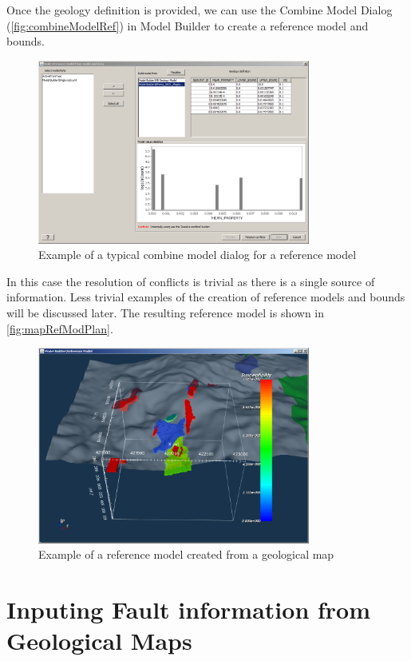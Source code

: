 Once the geology definition is provided, we can use the Combine Model Dialog (\autoref{fig:combineModelRef}) in Model Builder to create a reference model and bounds. 
\begin{figure} [h]
    \centering
    \includegraphics[width=0.8\textwidth]{images/MaptoModel/combineModelRef.PNG}
    \caption{Example of a typical combine model dialog for a reference model}
    \label{fig:combineModelRef}
\end{figure}
In this case the resolution of conflicts is trivial as there is a single source of information. Less trivial examples of the creation of reference models and bounds will be discussed later. The resulting reference model is shown in \autoref{fig:mapRefModPlan}.
\begin{figure} [h]
    \centering
    \includegraphics[width=0.8\textwidth]{images/MaptoModel/mapRefModPlan.PNG}
    \caption{Example of a reference model created from a geological map}
    \label{fig:mapRefModPlan}
\end{figure}

\section{Inputing Fault information from Geological Maps}
\label{sec:Inputing Fault information from Geological Maps}

